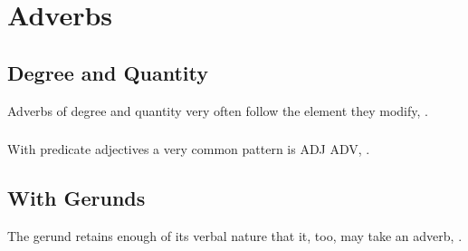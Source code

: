%
%
%

\section{Adverbs}

\subsection{Degree and Quantity} Adverbs of degree and quantity very
often follow the element they modify,  .

\subsubsection{} With predicate adjectives a very common pattern is
ADJ  ADV,  .

\subsection{With Gerunds} The gerund retains enough of its verbal
nature that it, too, may take an adverb,  .  \label{syn:adverbs:gerund}

